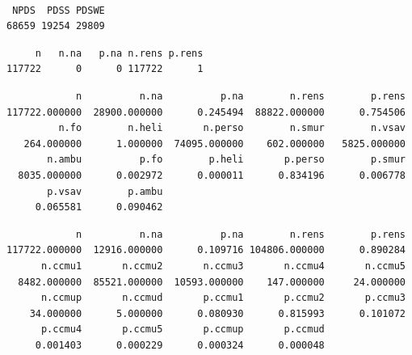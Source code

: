 \documentclass[]{article}
\newenvironment{Shaded}{\begin{snugshade}}{\end{snugshade}}
\newcommand{\KeywordTok}[1]{\textcolor[rgb]{0.13,0.29,0.53}{\textbf{{#1}}}}
\newcommand{\CommentTok}[1]{\textcolor[rgb]{0.56,0.35,0.01}{\textit{{#1}}}}
\newcommand{\NormalTok}[1]{{#1}}
\begin{document}
\begin{verbatim}

 NPDS  PDSS PDSWE 
68659 19254 29809 
\end{verbatim}

\begin{Shaded}
\end{Shaded}

\begin{verbatim}
     n   n.na   p.na n.rens p.rens 
117722      0      0 117722      1 
\end{verbatim}

\begin{Shaded}
\end{Shaded}

\begin{verbatim}
            n          n.na          p.na        n.rens        p.rens 
117722.000000  28900.000000      0.245494  88822.000000      0.754506 
         n.fo        n.heli       n.perso        n.smur        n.vsav 
   264.000000      1.000000  74095.000000    602.000000   5825.000000 
       n.ambu          p.fo        p.heli       p.perso        p.smur 
  8035.000000      0.002972      0.000011      0.834196      0.006778 
       p.vsav        p.ambu 
     0.065581      0.090462 
\end{verbatim}

\begin{Shaded}
\end{Shaded}

\begin{verbatim}
            n          n.na          p.na        n.rens        p.rens 
117722.000000  12916.000000      0.109716 104806.000000      0.890284 
      n.ccmu1       n.ccmu2       n.ccmu3       n.ccmu4       n.ccmu5 
  8482.000000  85521.000000  10593.000000    147.000000     24.000000 
      n.ccmup       n.ccmud       p.ccmu1       p.ccmu2       p.ccmu3 
    34.000000      5.000000      0.080930      0.815993      0.101072 
      p.ccmu4       p.ccmu5       p.ccmup       p.ccmud 
     0.001403      0.000229      0.000324      0.000048 
\end{verbatim}
\end{document}
